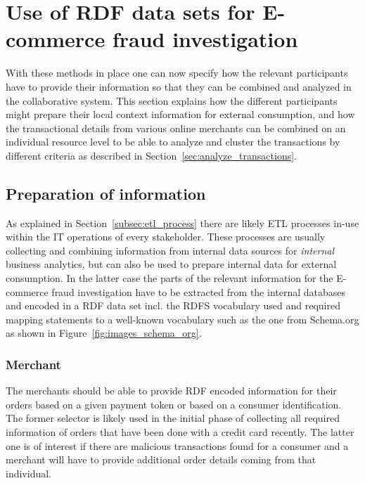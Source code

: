 
\section{Use of \gls{RDF} data sets for \gls{E-commerce} fraud investigation}
\label{sec:working_semantic_data}

With these methods in place one can now specify how the relevant participants have to provide their information so that they can be combined and analyzed in the collaborative system. This section explains how the different participants might prepare their local context information for external consumption, and how the transactional details from various online merchants can be combined on an individual resource level to be able to analyze and cluster the transactions by different criteria as described in Section~\ref{sec:analyze_transactions}.

\subsection{Preparation of information}
\label{subsec:prepare_information}

As explained in Section~\ref{subsec:etl_process} there are likely \gls{ETL} processes in-use within the \gls{IT} operations of every stakeholder. These processes are usually collecting and combining information from internal data sources for \emph{internal} business analytics, but can also be used to prepare internal data for external consumption. In the latter case the parts of the relevant information for the \gls{E-commerce} fraud investigation have to be extracted from the internal databases and encoded in a \gls{RDF} data set incl. the \gls{RDFS} vocabulary used and required mapping statements to a well-known vocabulary such as the one from Schema.org as shown in Figure~\ref{fig:images_schema_org}.

\subsubsection{Merchant}
\label{subsub:prep_info_merchant}

The merchants should be able to provide \gls{RDF} encoded information for their orders based on a given payment token or based on a consumer identification. The former selector is likely used in the initial phase of collecting all required information of orders that have been done with a credit card recently. The latter one is of interest if there are malicious transactions found for a consumer and a merchant will have to provide additional order details coming from that individual. \\

